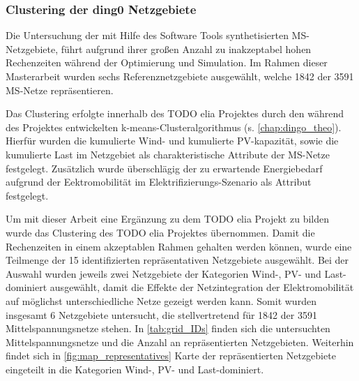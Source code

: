 \subsubsection{Clustering der ding0 Netzgebiete}


Die Untersuchung der mit Hilfe des Software Tools \dingo synthetisierten \gls{MS}-Netzgebiete, führt aufgrund ihrer großen Anzahl zu inakzeptabel hohen Rechenzeiten während der Optimierung und Simulation.
Im Rahmen dieser Masterarbeit wurden sechs Referenznetzgebiete ausgewählt, welche \num{1842} der \num{3591} \gls{MS}-Netze repräsentieren.\medskip

Das Clustering erfolgte innerhalb des {\color{red} TODO elia Projektes} durch den während des \openego Projektes entwickelten k-means-Clusteralgorithmus (s. \autoref{chap:dingo_theo}).
Hierfür wurden die kumulierte Wind- und kumulierte \gls{PV}-kapazität, sowie die kumulierte Last im Netzgebiet als charakteristische Attribute der \gls{MS}-Netze festgelegt.
Zusätzlich wurde überschlägig der zu erwartende Energiebedarf aufgrund der Eektromobilität im Elektrifizierungs-Szenario als Attribut festgelegt.\medskip


Um mit dieser Arbeit eine Ergänzung zu dem {\color{red} TODO elia Projekt} zu bilden wurde das Clustering des {\color{red} TODO elia Projektes} übernommen.
Damit die Rechenzeiten in einem akzeptablen Rahmen gehalten werden können, wurde eine Teilmenge der \num{15} identifizierten repräsentativen Netzgebiete ausgewählt.
Bei der Auswahl wurden jeweils zwei Netzgebiete der Kategorien Wind-, PV- und Last-dominiert ausgewählt, damit die Effekte der Netzintegration der Elektromobilität auf möglichst unterschiedliche Netze gezeigt werden kann.
Somit wurden insgesamt \num{6} Netzgebiete untersucht, die stellvertretend für \num{1842} der \num{3591} Mittelspannungsnetze stehen.
In \autoref{tab:grid_IDs} finden sich die untersuchten Mittelspannungsnetze und die Anzahl an repräsentierten Netzgebieten.
Weiterhin findet sich in \autoref{fig:map_representatives} Karte der repräsentierten Netzgebiete eingeteilt in die Kategorien Wind-, PV- und Last-dominiert.






